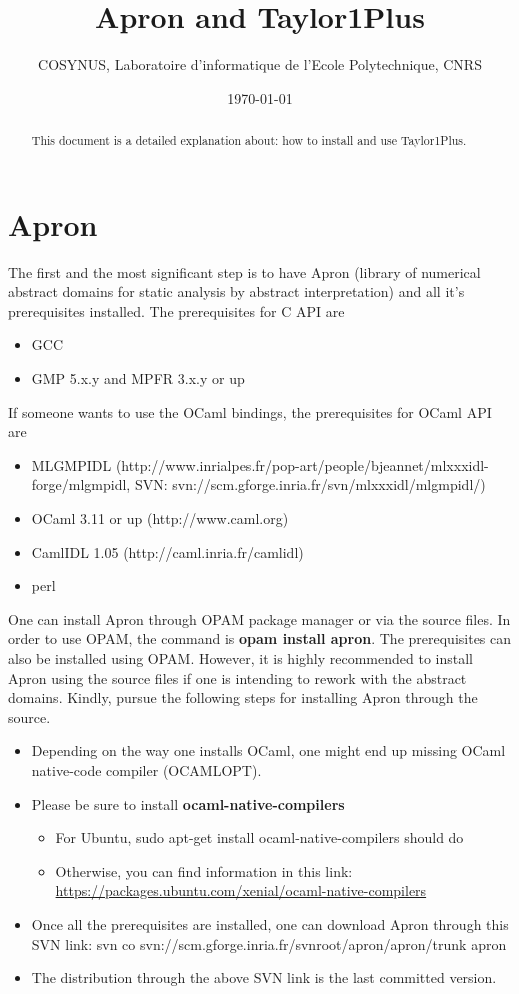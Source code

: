 \documentclass[a4paper]{article}
\title{Apron and Taylor1Plus}
\author{COSYNUS, Laboratoire d'informatique de l'Ecole Polytechnique, CNRS}
\date{\today}
\begin{document}
\maketitle

\sloppy

\begin{abstract}
This document is a detailed explanation about: how to install and use Taylor1Plus. 
\end{abstract}

\section{Apron}
\label{sec:introduction}
The first and the most significant step is to have Apron (library of numerical abstract domains for static analysis by
abstract interpretation) and all it's prerequisites installed. The prerequisites for C API are
\begin{itemize}
\item GCC
\item GMP 5.x.y and MPFR 3.x.y or up
\end{itemize}
If someone wants to use the OCaml bindings, the prerequisites for OCaml API are 
\begin{itemize}
\item MLGMPIDL (http://www.inrialpes.fr/pop-art/people/bjeannet/mlxxxidl-forge/mlgmpidl, SVN: svn://scm.gforge.inria.fr/svn/mlxxxidl/mlgmpidl/)
\item OCaml 3.11 or up (http://www.caml.org)
\item CamlIDL 1.05 (http://caml.inria.fr/camlidl)
\item perl
\end{itemize}
One can install Apron through OPAM package manager or via the source files. In order to use OPAM, the command is 
\textbf{opam install apron}. The prerequisites can also be installed using OPAM. However, it is highly recommended to install Apron using the source files if one is intending to rework with the abstract domains. Kindly, pursue the following steps for installing Apron through the source.
\begin{itemize}
\item Depending on the way one installs OCaml, one might end up missing OCaml native-code compiler (OCAMLOPT).
\item Please be sure to install \textbf{ocaml-native-compilers}
\begin{itemize}
\item For Ubuntu, sudo apt-get install ocaml-native-compilers should do
\item Otherwise, you can find information in this link: \url{https://packages.ubuntu.com/xenial/ocaml-native-compilers}
\end{itemize}
\item Once all the prerequisites are installed, one can download Apron through this SVN link:
      svn co svn://scm.gforge.inria.fr/svnroot/apron/apron/trunk apron
\item The distribution through the above SVN link is the last committed version. 
\end{itemize}
\end{document}
